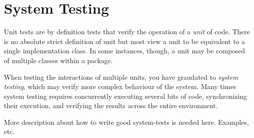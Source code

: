 \chapter{System Testing}

Unit tests are by definition tests that verify the operation
of a \emph{unit} of code.  There is no absolute strict definition
of unit but most view a unit to be equivalent to a single 
implementation class.  In some instances, though, a unit may be
composed of multiple classes within a package.  

When testing the interactions of multiple units, you have
graudated to \emph{system testing}, which may verify
more complex behaviour of the system.  Many times system
testing requires concurrently executing several bits of code,
synchronizing their execution, and verifying the results
across the entire environment.

\begin{ednote}
More description about how to write good system-tests is 
needed here.  Examples, etc.
\end{ednote}
